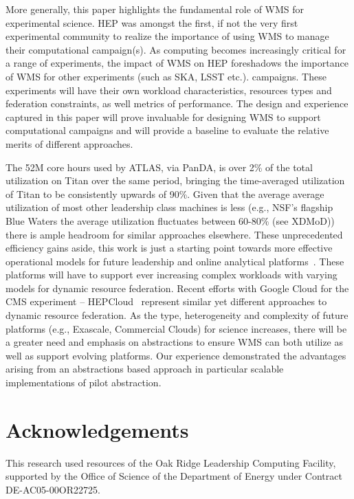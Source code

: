 \documentclass[conference]{IEEEtran}
\begin{document}
More generally, this paper highlights the fundamental role of WMS for
experimental science. HEP was amongst the first, if not the very first
experimental community to realize the importance of using WMS to manage their
computational campaign(s). As computing becomes increasingly critical for a
range of experiments, the impact of WMS on HEP foreshadows the importance of
WMS for other experiments (such as SKA, LSST etc.). %
campaigns. These experiments will have their own workload characteristics,
resources types and federation constraints, as well metrics of performance.
The design and experience captured in this paper will prove invaluable for
designing WMS to support computational campaigns and will provide a baseline
to evaluate the relative merits of different approaches.

The 52M core hours used by ATLAS, via PanDA, is over 2\% of the total
utilization on Titan over the same period, bringing the time-averaged
utilization of Titan to be consistently upwards of 90\%. Given that the
average average utilization of most other leadership class machines is less
(e.g., NSF's flagship Blue Waters the average utilization fluctuates between
60-80\% (see XDMoD\cite{bw-sucks})) there is ample headroom for similar
approaches elsewhere. These unprecedented efficiency gains aside, this work is
just a starting point towards more effective operational models for future
leadership and online analytical platforms~\cite{foap-url}. These platforms
will have to support ever increasing complex workloads with varying models for
dynamic resource federation. Recent efforts with Google Cloud for the CMS
experiment -- HEPCloud~\cite{hepcloud,googlehep} represent similar yet
different approaches to dynamic resource federation. As the type,
heterogeneity and complexity of future platforms  (e.g., Exascale, Commercial
Clouds) for science increases, there will be a greater need and emphasis on
abstractions to ensure WMS can both utilize as well as support evolving
platforms. Our experience demonstrated the advantages arising from an
abstractions based approach \textendash{} in particular scalable implementations
of pilot abstraction.


\section*{Acknowledgements}
\label{sec:ack}

This research used resources of the Oak Ridge Leadership Computing Facility,
supported by the Office of Science of the Department of Energy under Contract
DE-AC05-00OR22725.




\end{document}
